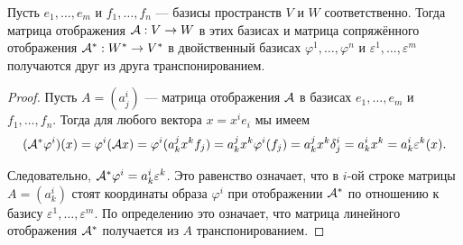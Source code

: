 \begin{proposal}
    Пусть $e_1, \ldots, e_m$ и $f_1, \ldots, f_n$ --- базисы пространств $V$ и $W$ соответственно. Тогда матрица отображения $\mathcal{A}: V \to W$ в этих базисах и матрица сопряжённого отображения $\mathcal{A}^\ast: W^\ast \to V^\ast$ в двойственный базисах $\varphi^1, \ldots, \varphi^n$ и $\varepsilon^1, \ldots, \varepsilon^m$ получаются друг из друга транспонированием.
\end{proposal}

\begin{proof}
    Пусть $A = (a^i_j)$ --- матрица отображения $\mathcal{A}$ в базисах $e_1, \ldots, e_m$ и $f_1, \ldots, f_n$. Тогда для любого вектора $x = x^ie_i$ мы имеем
    \[
        (\mathcal{A}^\ast\varphi^i)(x) = \varphi^i(\mathcal{A} x) = \varphi^i(a^j_kx^kf_j) = a^j_kx^k\varphi^i(f_j) = a^j_kx^k\delta^i_j = a^i_kx^k = a^i_k\varepsilon^k(x).
    \]

    Следовательно, $\mathcal{A}^\ast\varphi^i = a^i_k\varepsilon^k$. Это равенство означает, что в $i$-ой строке матрицы $A = (a^i_k)$ стоят координаты образа $\varphi^i$ при отображении $\mathcal{A}^\ast$ по отношению к базису $\varepsilon^1, \ldots, \varepsilon^m$. По определению это означает, что матрица линейного отображения $\mathcal{A}^\ast$ получается из $A$ транспонированием.
\end{proof}


